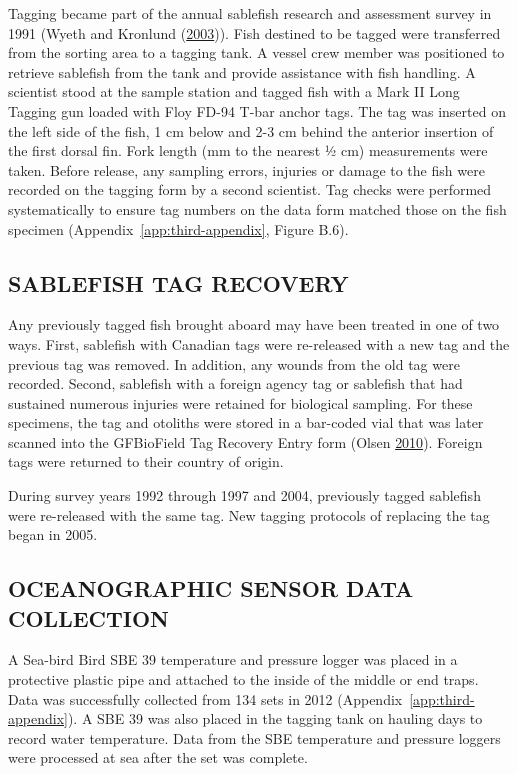 \documentclass[12pt]{article}\usepackage[]{graphicx}\usepackage[]{color}
\begin{document}
Tagging became part of the annual sablefish research and assessment survey in 1991 (Wyeth and Kronlund (\protect\hyperlink{ref-Wyeth2003}{2003})). Fish destined to be tagged were transferred from the sorting area to a tagging tank. A vessel crew member was positioned to retrieve sablefish from the tank and provide assistance with fish handling. A scientist stood at the sample station and tagged fish with a Mark II Long Tagging gun loaded with Floy FD-94 T-bar anchor tags. The tag was inserted on the left side of the fish, 1 cm below and 2-3 cm behind the anterior insertion of the first dorsal fin. Fork length (mm to the nearest ½ cm) measurements were taken. Before release, any sampling errors, injuries or damage to the fish were recorded on the tagging form by a second scientist. Tag checks were performed systematically to ensure tag numbers on the data form matched those on the fish specimen (Appendix~\ref{app:third-appendix}, Figure B.6).

\hypertarget{sablefish-tag-recovery}{%
\subsection{SABLEFISH TAG RECOVERY}\label{sablefish-tag-recovery}}

Any previously tagged fish brought aboard may have been treated in one of two ways. First, sablefish with Canadian tags were re-released with a new tag and the previous tag was removed. In addition, any wounds from the old tag were recorded. Second, sablefish with a foreign agency tag or sablefish that had sustained numerous injuries were retained for biological sampling. For these specimens, the tag and otoliths were stored in a bar-coded vial that was later scanned into the GFBioField Tag Recovery Entry form (Olsen \protect\hyperlink{ref-Olsen2010}{2010}). Foreign tags were returned to their country of origin.

During survey years 1992 through 1997 and 2004, previously tagged sablefish were re-released with the same tag. New tagging protocols of replacing the tag began in 2005.

\hypertarget{oceanographic-sensor-data-collection}{%
\subsection{OCEANOGRAPHIC SENSOR DATA COLLECTION}\label{oceanographic-sensor-data-collection}}

A Sea-bird Bird SBE 39 temperature and pressure logger was placed in a protective plastic pipe and attached to the inside of the middle or end traps. Data was successfully collected from 134 sets in 2012 (Appendix~\ref{app:third-appendix}). A SBE 39 was also placed in the tagging tank on hauling days to record water temperature. Data from the SBE temperature and pressure loggers were processed at sea after the set was complete.
\end{document}
